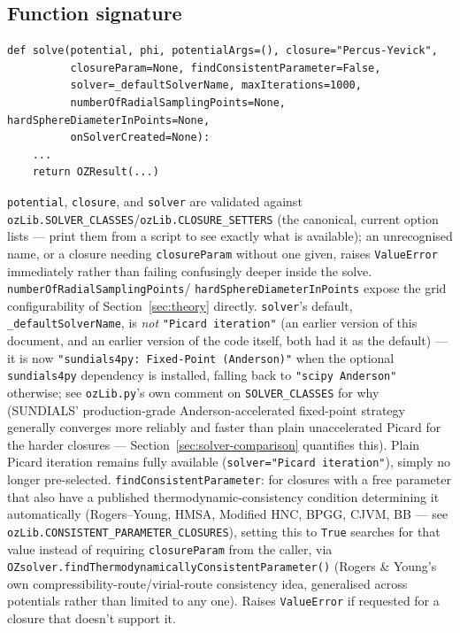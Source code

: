 \documentclass[11pt,a4paper]{article}
\newcommand{\code}[1]{\texttt{#1}}
\begin{document}
\subsection{Function signature}
\begin{lstlisting}
def solve(potential, phi, potentialArgs=(), closure="Percus-Yevick",
          closureParam=None, findConsistentParameter=False,
          solver=_defaultSolverName, maxIterations=1000,
          numberOfRadialSamplingPoints=None, hardSphereDiameterInPoints=None,
          onSolverCreated=None):
    ...
    return OZResult(...)
\end{lstlisting}
\code{potential}, \code{closure}, and \code{solver} are validated against
\code{ozLib.SOLVER\_CLASSES}/\code{ozLib.CLOSURE\_SETTERS} (the canonical,
current option lists --- print them from a script to see exactly what is
available); an unrecognised name, or a closure needing \code{closureParam}
without one given, raises \code{ValueError} immediately rather than failing
confusingly deeper inside the solve. \code{numberOfRadialSamplingPoints}/
\code{hardSphereDiameterInPoints} expose the grid configurability of
Section~\ref{sec:theory} directly. \code{solver}'s default,
\code{\_defaultSolverName}, is \emph{not} \code{"Picard iteration"} (an earlier
version of this document, and an earlier version of the code itself, both had
it as the default) --- it is now \code{"sundials4py: Fixed-Point (Anderson)"}
when the optional \code{sundials4py} dependency is installed, falling back to
\code{"scipy Anderson"} otherwise; see \code{ozLib.py}'s own comment on
\code{SOLVER\_CLASSES} for why (SUNDIALS' production-grade Anderson-accelerated
fixed-point strategy generally converges more reliably and faster than plain
unaccelerated Picard for the harder closures --- Section~\ref{sec:solver-comparison}
quantifies this). Plain Picard iteration remains fully available
(\code{solver="Picard iteration"}), simply no longer pre-selected.
\code{findConsistentParameter}: for closures with a free parameter that also
have a published thermodynamic-consistency condition determining it
automatically (Rogers--Young, HMSA, Modified HNC, BPGG, CJVM, BB --- see
\code{ozLib.CONSISTENT\_PARAMETER\_CLOSURES}), setting this to \code{True}
searches for that value instead of requiring \code{closureParam} from the
caller, via \code{OZsolver.findThermodynamicallyConsistentParameter()}
(Rogers \& Young's own compressibility-route/virial-route consistency idea,
generalised across potentials rather than limited to any one). Raises
\code{ValueError} if requested for a closure that doesn't support it.
\end{document}
